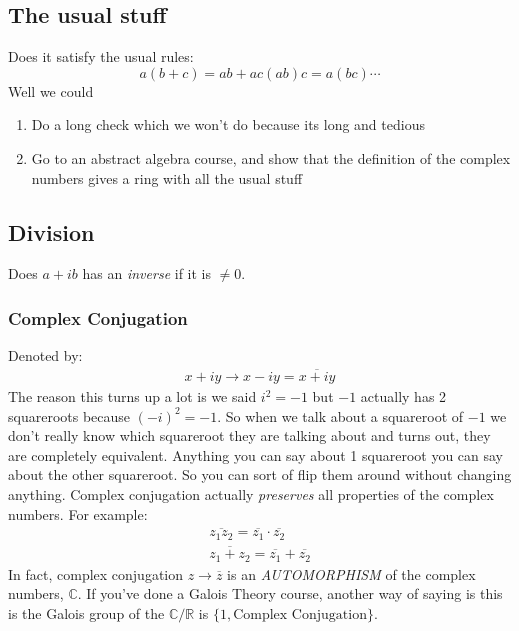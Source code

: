 \documentclass{article}
\begin{document}
\subsection{The usual stuff}
Does it satisfy the usual rules:
\begin{equation*}
	a(b+c) = ab+ac
	(ab)c = a(bc)
	\cdots
\end{equation*}
Well we could
\begin{enumerate}
	\item Do a long check which we won't do because its long and tedious
	\item Go to an abstract algebra course, and show that the definition of the complex numbers gives a ring
	      with all the usual stuff
\end{enumerate}
\subsection{Division}
Does $a+ib$ has an \textit{inverse} if it is $\neq 0$.

\subsubsection{Complex Conjugation}
Denoted by:
\begin{gather*}
	x + iy \rightarrow x - iy = \overline{x+iy}
\end{gather*}
The reason this turns up a lot is we said $i^{2} = -1$ but $-1$
actually has 2 squareroots because $(-i)^{2} = -1$. So when we talk about
a squareroot of $-1$ we don't really know which squareroot they
are talking about and turns out, they are completely equivalent. Anything
you can say about 1 squareroot you can say about the other squareroot.
So you can sort of flip them around without changing anything. Complex
conjugation actually \textit{preserves} all properties of the complex
numbers. For example:
\begin{gather*}
	\overline{z_{1}z_{2}} = \overline{z_1} \cdot \overline{z_2} \\
	\overline{z_{1}+z_{2}} = \overline{z_1} + \overline{z_2}
\end{gather*}
In fact, complex conjugation $z \rightarrow \overline{z}$ is an \textit{AUTOMORPHISM}
of the complex numbers, $\mathbb{C}$. If you've done a Galois Theory course, another way
of saying is this is the Galois group of the $\mathbb{C}/\mathbb{R}$ is
$\{1,\text{Complex Conjugation}\}$.
\end{document}
